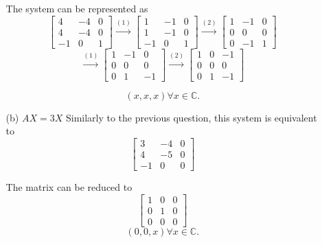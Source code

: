 \documentclass{article}
\begin{document}
\begin{enumerate}[listparindent=\parindent]
\begin{enumerate}
    The system can be represented as
    \[
        \begin{bmatrix}
            4 & -4 & 0 \\
            4 & -4 & 0 \\
            -1 & 0 & 1
        \end{bmatrix}
        \xrightarrow{(1)}
        \begin{bmatrix}
            1 & -1 & 0 \\
            1 & -1 & 0 \\
            -1 & 0 & 1
        \end{bmatrix}
        \xrightarrow{(2)}
        \begin{bmatrix}
            1 & -1 & 0 \\
            0 & 0 & 0 \\
            0 & -1 & 1
        \end{bmatrix}
    \]
    \[
        \xrightarrow{(1)}
        \begin{bmatrix}
            1 & -1 & 0 \\
            0 & 0 & 0 \\
            0 & 1 & -1
        \end{bmatrix}
        \xrightarrow{(2)}
        \begin{bmatrix}
            1 & 0 & -1 \\
            0 & 0 & 0 \\
            0 & 1 & -1
        \end{bmatrix}
    \]

    \[ \boxed {
        (x, x, x) \forall x \in \mathbb C.
    } \]

\item[(b)] \(AX = 3X\)
    Similarly to the previous question, this system is equivalent to
    \[
        \begin{bmatrix}
            3 & -4 & 0 \\
            4 & -5 & 0 \\
            -1 & 0 & 0
        \end{bmatrix}
    \]

    The matrix can be reduced to
    \[
        \begin{bmatrix}
            1 & 0 & 0 \\
            0 & 1 & 0 \\
            0 & 0 & 0
        \end{bmatrix}
    \]
    \[ \boxed {
        (0, 0, x) \forall x \in \mathbb C.
    } \]
\end{enumerate}


\end{enumerate}
\end{document}
